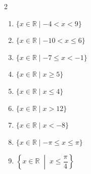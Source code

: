 \begin{enumerate}[label=\arabic*., leftmargin=*]
\begin{multicols}{2}
\begin{enumerate}[label=\theenumi\arabic*), leftmargin=*]
		\item $\{x \in \mathbb{R} \mid -4 < x < 9\}$
		\item $\{x \in \mathbb{R} \mid -10 < x \leqslant 6\}$
		\item $\{x \in \mathbb{R} \mid -7 \leqslant x < -1\}$
		\item $\{x \in \mathbb{R} \mid x \geqslant 5\}$
		\item $\{x \in \mathbb{R} \mid x \leqslant 4\}$
		\item $\{x \in \mathbb{R} \mid x > 12\}$
		\item $\{x \in \mathbb{R} \mid x < -8\}$
		\item $\{x \in \mathbb{R} \mid -\pi \leqslant x \leqslant \pi\}$
		\item $\left\{x \in \mathbb{R} \;\middle|\; x \leqslant \dfrac{\pi}{4}\right\}$
	\end{enumerate}
\end{multicols}


\end{enumerate}
